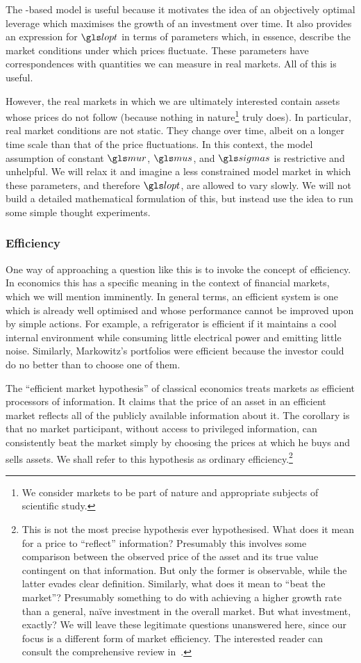 The \GBM-based model is useful because it motivates the idea of an objectively optimal leverage which maximises the growth of an investment over time. It also provides an expression for $\lopt$ in terms of parameters which, in essence, describe the market conditions under which prices fluctuate. These parameters have correspondences with quantities we can measure in real markets. All of this is useful.

However, the real markets in which we are ultimately interested contain assets whose prices do not follow \GBM (because nothing in nature\footnote{We consider markets to be part of nature and appropriate subjects of scientific study.} truly does). In particular, real market conditions are not static. They change over time, albeit on a longer time scale than that of the price fluctuations. In this context, the model assumption of constant $\mur$, $\mus$, and $\sigmas$ is restrictive and unhelpful. We will relax it and imagine a less constrained model market in which these parameters, and therefore $\lopt$, are allowed to vary slowly. We will not build a detailed mathematical formulation of this, but instead use the idea to run some simple thought experiments.

\subsubsection{Efficiency}
One way of approaching a question like this is to invoke the concept of efficiency. In economics this has a specific meaning in the context of financial markets, which we will mention imminently. In general terms, an efficient system is one which is already well optimised and whose performance cannot be improved upon by simple actions. For example, a refrigerator is efficient if it maintains a cool internal environment while consuming little electrical power and emitting little noise. Similarly, Markowitz's portfolios were efficient because the investor could do no better than to choose one of them. 

The ``efficient market hypothesis'' of classical economics treats markets as efficient processors of information. It claims that the price of an asset in an efficient market reflects all of the publicly available information about it. The corollary is that no market participant, without access to privileged information, can consistently beat the market simply by choosing the prices at which he buys and sells assets. We shall refer to this hypothesis as ordinary efficiency.\footnote{This is not the most precise hypothesis ever hypothesised. What does it mean for a price to ``reflect'' information? Presumably this involves some comparison between the observed price of the asset and its true value contingent on that information. But only the former is observable, while the latter evades clear definition. Similarly, what does it mean to ``beat the market''? Presumably something to do with achieving a higher growth rate than a general, na\"{i}ve investment in the overall market. But what investment, exactly? We will leave these legitimate questions unanswered here, since our focus is a different form of market efficiency. The interested reader can consult the comprehensive review in~\cite{Sewell2011}.}

